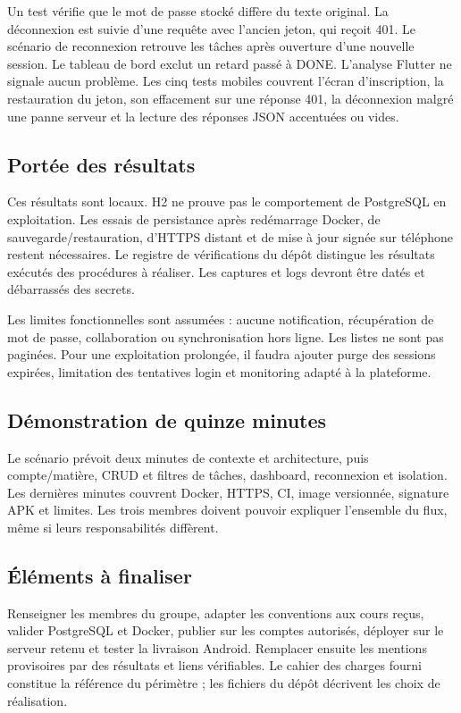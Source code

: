 \documentclass[11pt,a4paper]{article}
\begin{document}
Un test vérifie que le mot de passe stocké diffère du texte original. La déconnexion est suivie d'une requête avec l'ancien jeton, qui reçoit 401. Le scénario de reconnexion retrouve les tâches après ouverture d'une nouvelle session. Le tableau de bord exclut un retard passé à DONE. L'analyse Flutter ne signale aucun problème. Les cinq tests mobiles couvrent l'écran d'inscription, la restauration du jeton, son effacement sur une réponse 401, la déconnexion malgré une panne serveur et la lecture des réponses JSON accentuées ou vides.

\subsection*{Portée des résultats}
Ces résultats sont locaux. H2 ne prouve pas le comportement de PostgreSQL en exploitation. Les essais de persistance après redémarrage Docker, de sauvegarde/restauration, d'HTTPS distant et de mise à jour signée sur téléphone restent nécessaires. Le registre de vérifications du dépôt distingue les résultats exécutés des procédures à réaliser. Les captures et logs devront être datés et débarrassés des secrets.

Les limites fonctionnelles sont assumées : aucune notification, récupération de mot de passe, collaboration ou synchronisation hors ligne. Les listes ne sont pas paginées. Pour une exploitation prolongée, il faudra ajouter purge des sessions expirées, limitation des tentatives login et monitoring adapté à la plateforme.

\subsection*{Démonstration de quinze minutes}
Le scénario prévoit deux minutes de contexte et architecture, puis compte/matière, CRUD et filtres de tâches, dashboard, reconnexion et isolation. Les dernières minutes couvrent Docker, HTTPS, CI, image versionnée, signature APK et limites. Les trois membres doivent pouvoir expliquer l'ensemble du flux, même si leurs responsabilités diffèrent.

\subsection*{Éléments à finaliser}
Renseigner les membres du groupe, adapter les conventions aux cours reçus, valider PostgreSQL et Docker, publier sur les comptes autorisés, déployer sur le serveur retenu et tester la livraison Android. Remplacer ensuite les mentions provisoires par des résultats et liens vérifiables. Le cahier des charges fourni constitue la référence du périmètre ; les fichiers du dépôt décrivent les choix de réalisation.
\end{document}
